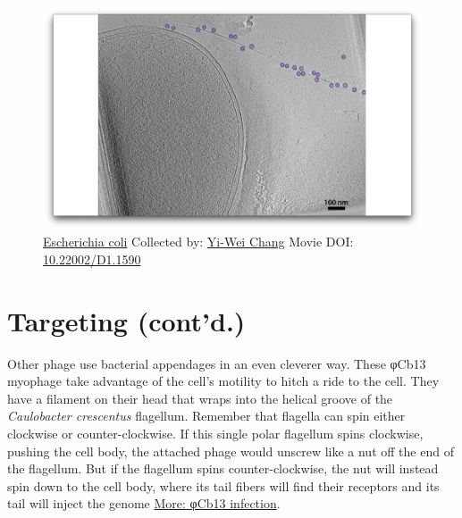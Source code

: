 \documentclass[]{tufte-book}
\begin{document}
\begin{figure}
\includegraphics{movie_stills/10_5} \caption[\protect\hyperlink{tree}{Escherichia coli} Collected by:
\protect\hyperlink{yi-wei_chang}{Yi-Wei Chang} Movie DOI:
\href{https://doi.org/10.22002/D1.1590}{10.22002/D1.1590}]{\protect\hyperlink{tree}{Escherichia coli} Collected by:
\protect\hyperlink{yi-wei_chang}{Yi-Wei Chang} Movie DOI:
\href{https://doi.org/10.22002/D1.1590}{10.22002/D1.1590}}\label{fig:10-5}
\end{figure}

\section{Targeting (cont'd.)}\label{targeting-contd.}

Other phage use bacterial appendages in an even cleverer way. These
φCb13 myophage take advantage of the cell's motility to hitch a ride to
the cell. They have a filament on their head that wraps into the helical
groove of the \emph{Caulobacter crescentus} flagellum. Remember that
flagella can spin either clockwise or counter-clockwise. If this single
polar flagellum spins clockwise, pushing the cell body, the attached
phage would unscrew like a nut off the end of the flagellum. But if the
flagellum spins counter-clockwise, the nut will instead spin down to the
cell body, where its tail fibers will find their receptors and its tail
will inject the genome \protect\hyperlink{ux3c6Cb13_infection}{More:
φCb13 infection}.
\end{document}
